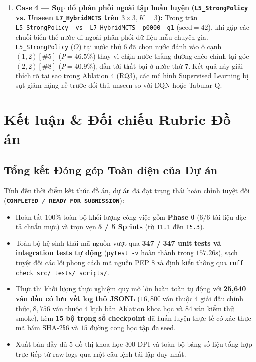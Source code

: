 \documentclass[a4paper,12pt]{report}
\begin{document}
\begin{enumerate}[leftmargin=1.2cm]
    \item \textbf{Case 4 --- Sụp đổ phân phối ngoài tập huấn luyện (\texttt{L5\_\allowbreak StrongPolicy} vs. Unseen \texttt{L7\_\allowbreak HybridMCTS} trên $3 \times 3, K=3$):}
    Trong trận \texttt{L5\_\allowbreak StrongPolicy\_\_\allowbreak vs\_\_\allowbreak L7\_\allowbreak HybridMCTS\_\_\allowbreak p0000\_\_\allowbreak g1} ($\text{seed}=42$), khi gặp các chuỗi biến thể nước đi ngoài phân phối dữ liệu mẫu chuyên gia, \texttt{L5\_\allowbreak StrongPolicy} ($O$) tại nước thứ 6 đã chọn nước đánh vào ô cạnh $(1,2)[\#5]$ ($P = 46.5\%$) thay vì chặn nước thắng đường chéo chính tại góc $(2,2)[\#8]$ ($P = 40.9\%$), dẫn tới thất bại ở nước thứ 7. Kết quả này giải thích rõ tại sao trong Ablation 4 (RQ3), các mô hình Supervised Learning bị sụt giảm nặng nề trước đối thủ unseen so với DQN hoặc Tabular Q.
\end{enumerate}

\clearpage
\section{Kết luận \& Đối chiếu Rubric Đồ án}

\subsection{Tổng kết Đóng góp Toàn diện của Dự án}
Tính đến thời điểm kết thúc đồ án, dự án đã đạt trạng thái hoàn chỉnh tuyệt đối (\textbf{\texttt{COMPLETED / READY FOR SUBMISSION}}):
\begin{itemize}[leftmargin=1.2cm]
    \item Hoàn tất $100\%$ toàn bộ khối lượng công việc gồm \textbf{Phase 0} ($6/6$ tài liệu đặc tả chuẩn mực) và trọn vẹn \textbf{5 / 5 Sprints} (từ \texttt{T1.1} đến \texttt{T5.3}).
    \item Toàn bộ hệ sinh thái mã nguồn vượt qua \textbf{347 / 347 unit tests và integration tests tự động} (\texttt{pytest -v} hoàn thành trong $157.26\text{s}$), sạch tuyệt đối các lỗi phong cách mã nguồn PEP 8 và định kiểu thông qua \texttt{ruff check src/ tests/ scripts/}.
    \item Thực thi khối lượng thực nghiệm quy mô lớn hoàn toàn tự động với \textbf{25,640 ván đấu có lưu vết log thô JSONL} ($16{,}800$ ván thuộc 4 giải đấu chính thức, $8{,}756$ ván thuộc 4 kịch bản Ablation khoa học và $84$ ván kiểm thử smoke), kèm \textbf{15 bộ trọng số checkpoint} đã huấn luyện thực tế có xác thực mã băm SHA-256 và $15$ đường cong học tập đa seed.
    \item Xuất bản đầy đủ $5$ đồ thị khoa học $300\text{ DPI}$ và toàn bộ bảng số liệu tổng hợp trực tiếp từ raw logs qua một câu lệnh tái lập duy nhất.
\end{itemize}
\end{document}
